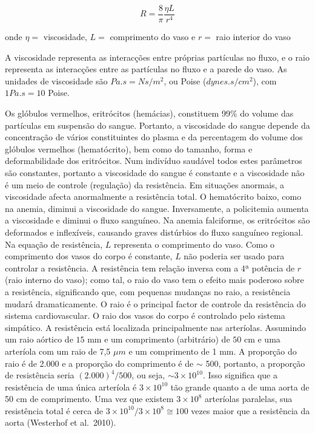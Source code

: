 \documentclass[
  portuguese,
  ]{book}
\begin{document}
\begin{equation}
R=\frac{8}{\pi}\frac{\eta L}{r^4}
\label{eq:resis}
\end{equation}

onde \(\eta=\) viscosidade, \(L=\) comprimento do vaso e \(r=\) raio interior do vaso

A viscosidade representa as interacções entre próprias partículas no fluxo, e o raio representa as interacções entre as partículas no fluxo e a parede do vaso. As unidades de viscosidade são \(Pa.s = Ns / m^2\), ou Poise (\(dynes.s / cm^2\)), com \(1 Pa.s = 10\) Poise.

Os glóbulos vermelhos, eritrócitos (hemácias), constituem 99\% do volume das partículas em suspensão do sangue. Portanto, a viscosidade do sangue depende da concentração de vários constituintes do plasma e da percentagem do volume dos glóbulos vermelhos (hematócrito), bem como do tamanho, forma e deformabilidade dos eritrócitos. Num indivíduo saudável todos estes parâmetros são constantes, portanto a viscosidade do sangue é constante e a viscosidade não é um meio de controle (regulação) da resistência. Em situações anormais, a viscosidade afecta anormalmente a resistência total. O hematócrito baixo, como na anemia, diminui a viscosidade do sangue. Inversamente, a policitemia aumenta a viscosidade e diminui o fluxo sanguíneo. Na anemia falciforme, os eritrócitos são deformados e inflexíveis, causando graves distúrbios do fluxo sanguíneo regional.
Na equação de resistência, \(L\) representa o comprimento do vaso. Como o comprimento dos vasos do corpo é constante, \(L\) não poderia ser usado para controlar a resistência.
A resistência tem relação inversa com a 4ª potência de \(r\) (raio interno do vaso); como tal, o raio do vaso tem o efeito mais poderoso sobre a resistência, significando que, com pequenas mudanças no raio, a resistência mudará dramaticamente. O raio é o principal factor de controle da resistência do sistema cardiovascular. O raio dos vasos do corpo é controlado pelo sistema simpático.
A resistência está localizada principalmente nas arteríolas. Assumindo um raio aórtico de \(15\) mm e um comprimento (arbitrário) de \(50\) cm e uma arteríola com um raio de 7,5 \(\mu m\) e um comprimento de 1 mm. A proporção do raio é de 2.000 e a proporção do comprimento é de \(\sim\) 500, portanto, a proporção de resistência seria \((2.000)^4/500\), ou seja, \(\sim 3\times10^{10}\). Isso significa que a resistência de uma única arteríola é \(3\times10^{10}\) tão grande quanto a de uma aorta de 50 cm de comprimento. Uma vez que existem \(3\times10^8\) arteríolas paralelas, sua resistência total é cerca de \(3\times10^{10}/3\times10^8 \cong 100\) vezes maior que a resistência da aorta (Westerhof et al.~2010).
\end{document}
